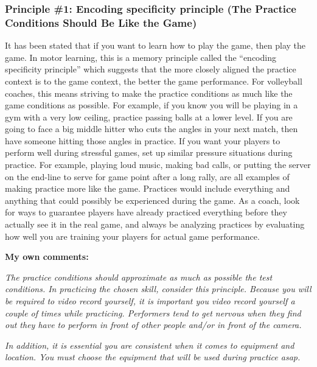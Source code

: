 \documentclass[
  letterpaper,
  DIV=11,
  numbers=noendperiod]{scrartcl}
\begin{document}
\hypertarget{principle-1-encoding-specificity-principle-the-practice-conditions-should-be-like-the-game}{%
\subsubsection{\texorpdfstring{\textbf{Principle \#1: Encoding
specificity principle (The Practice Conditions Should Be Like the
Game)}}{Principle \#1: Encoding specificity principle (The Practice Conditions Should Be Like the Game)}}\label{principle-1-encoding-specificity-principle-the-practice-conditions-should-be-like-the-game}}

It has been stated that if you want to learn how to play the game, then
play the game. In motor learning, this is a memory principle called the
``encoding specificity principle'' which suggests that the more closely
aligned the practice context is to the game context, the better the game
performance. For volleyball coaches, this means striving to make the
practice conditions as much like the game conditions as possible. For
example, if you know you will be playing in a gym with a very low
ceiling, practice passing balls at a lower level. If you are going to
face a big middle hitter who cuts the angles in your next match, then
have someone hitting those angles in practice. If you want your players
to perform well during stressful games, set up similar pressure
situations during practice. For example, playing loud music, making bad
calls, or putting the server on the end-line to serve for game point
after a long rally, are all examples of making practice more like the
game. Practices would include everything and anything that could
possibly be experienced during the game. As a coach, look for ways to
guarantee players have already practiced everything before they actually
see it in the real game, and always be analyzing practices by evaluating
how well you are training your players for actual game performance.

\textbf{My own comments:}

\emph{The practice conditions should approximate as much as possible the
test conditions. In practicing the chosen skill, consider this
principle. Because you will be required to video record yourself, it is
important you video record yourself a couple of times while practicing.
Performers tend to get nervous when they find out they have to perform
in front of other people and/or in front of the camera.}

\emph{In addition, it is essential you are consistent when it comes to
equipment and location. You must choose the equipment that will be used
during practice asap.}
\end{document}
